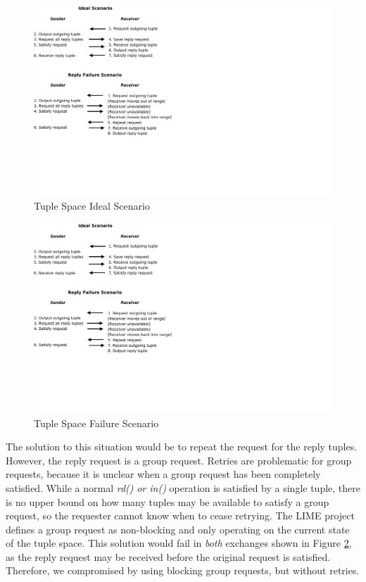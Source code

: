 \begin{figure}
\centering
\includegraphics[scale = 1 , clip, trim = 0px 400px 500px 35px]{figures/tuple-failure.pdf}
\caption{Tuple Space Ideal Scenario}
\label{fig:tuple-success}
\end{figure}

\begin{figure}
\centering
\includegraphics[scale = 1 , clip, trim = 0px 180px 450px 230px]{figures/tuple-failure.pdf}
\caption{Tuple Space Failure Scenario}
\label{fig:tuple-failure}
\end{figure}

The solution to this situation would be to repeat the request for the reply tuples. However, the reply request is a group request. Retries are problematic for group requests, because it is unclear when a group request has been completely satisfied. While a normal \textit{rd()} \textit{or in()} operation is satisfied by a single tuple, there is no upper bound on how many tuples may be available to satisfy a group request, so the requester cannot know when to cease retrying. The LIME\cite{lime} project defines a group request as non-blocking and only operating on the current state of the tuple space. This solution would fail in \textit{both} exchanges shown in Figure \ref{fig:tuple-failure}, as the reply request may be received before the original request is satisfied. Therefore, we compromised by using blocking group requests, but without retries.

